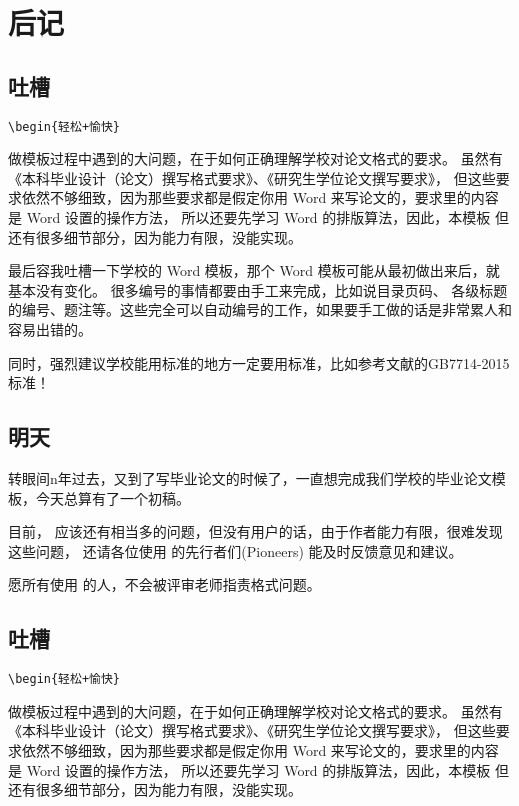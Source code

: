 \chapter{后记}

\section{吐槽}

\verb!\begin{轻松+愉快}!

做模板过程中遇到的大问题，在于如何正确理解学校对论文格式的要求。
虽然有《本科毕业设计（论文）撰写格式要求》、《研究生学位论文撰写要求》，
但这些要求依然不够细致，因为那些要求都是假定你用 Word 来写论文的，要求里的内容是 Word 设置的操作方法，
所以还要先学习 Word 的排版算法，因此，本模板
但还有很多细节部分，因为能力有限，没能实现。

最后容我吐槽一下学校的 Word 模板，那个 Word 模板可能从最初做出来后，就基本没有变化。
很多编号的事情都要由手工来完成，比如说目录页码、
各级标题的编号、题注等。这些完全可以自动编号的工作，如果要手工做的话是非常累人和容易出错的。

同时，强烈建议学校能用标准的地方一定要用标准，比如参考文献的GB7714-2015标准！

\section{明天}

转眼间n年过去，又到了写毕业论文的时候了，一直想完成我们学校的毕业论文模板，今天总算有了一个初稿。

目前， \nwafuthesis{} 应该还有相当多的问题，但没有用户的话，由于作者能力有限，很难发现这些问题，
还请各位使用 \nwafuthesis{} 的先行者们(Pioneers) 能及时反馈意见和建议。

愿所有使用 \nwafuthesis{} 的人，不会被评审老师指责格式问题。

\section{吐槽}

\verb!\begin{轻松+愉快}!

做模板过程中遇到的大问题，在于如何正确理解学校对论文格式的要求。
虽然有《本科毕业设计（论文）撰写格式要求》、《研究生学位论文撰写要求》，
但这些要求依然不够细致，因为那些要求都是假定你用 Word 来写论文的，要求里的内容是 Word 设置的操作方法，
所以还要先学习 Word 的排版算法，因此，本模板
但还有很多细节部分，因为能力有限，没能实现。

